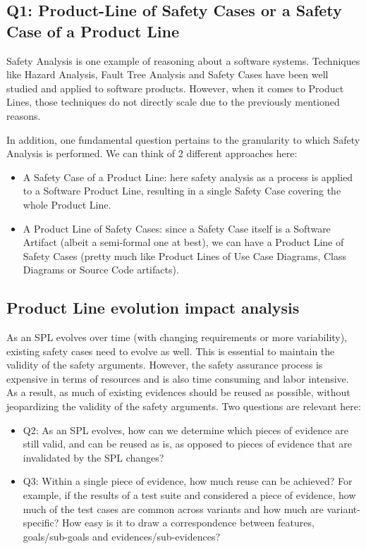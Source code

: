 \documentclass[11pt]{article}
\begin{document}
\subsection{Q1: Product-Line of Safety Cases or a Safety Case of a Product Line}

Safety Analysis is one example of reasoning about a software systems. Techniques like Hazard Analysis, Fault Tree Analysis and Safety Cases have been well studied and applied to software products. However, when it comes to Product Lines, those techniques do not directly scale due to the previously mentioned reasons. 

In addition, one fundamental question pertains to the granularity to which Safety Analysis is performed. We can think of 2 different approaches here:

\begin{itemize}

\item A Safety Case of a Product Line: here safety analysis as a process is applied to a Software Product Line, resulting in a single Safety Case covering the whole Product Line.

\item A Product Line of Safety Cases: since a Safety Case itself is a Software Artifact (albeit a semi-formal one at best), we can have a Product Line of Safety Cases (pretty much like Product Lines of Use Case Diagrams, Class Diagrams or Source Code artifacts). 

\end{itemize}

\subsection{Product Line evolution impact analysis}

As an SPL evolves over time (with changing requirements or more variability), existing safety cases need to evolve as well. This is essential to maintain the validity of the safety arguments. However, the safety assurance process is expensive in terms of resources and is also time consuming and labor intensive. As a result, as much of existing evidences should be reused as possible, without jeopardizing the validity of the safety arguments. Two questions are relevant here:

\begin{itemize}

\item Q2: As an SPL evolves, how can we determine which pieces of evidence are still valid, and can be reused as is, as opposed to pieces of evidence that are invalidated by the SPL changes?

\item Q3: Within a single piece of evidence, how much reuse can be achieved? For example, if the results of a test suite and considered a piece of evidence, how much of the test cases are common across variants and how much are variant-specific? How easy is it to draw a correspondence between features, goals/sub-goals and evidences/sub-evidences? 

\end{itemize}



\end{document}
